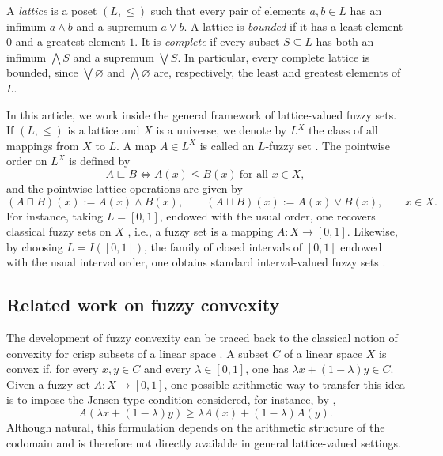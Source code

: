 \documentclass[11pt,a4paper]{article}
\begin{document}
\smallskip

A \emph{lattice} is a poset \((L,\leq)\) such that every pair of elements \(a,b\in L\) has an infimum \(a\wedge b\) and a supremum \(a\vee b\). A lattice is \emph{bounded} if it has a least element \(0\) and a greatest element \(1\). It is \emph{complete} if every subset \(S\subseteq L\) has both an infimum \(\bigwedge S\) and a supremum \(\bigvee S\). In particular, every complete lattice is bounded, since \(\bigvee\varnothing\) and \(\bigwedge\varnothing\) are, respectively, the least and greatest elements of \(L\).

\smallskip

In this article, we work inside the general framework of lattice-valued fuzzy sets. If \((L,\leq)\) is a lattice and \(X\) is a universe, we denote by \(L^X\) the class of all mappings from \(X\) to \(L\). A map \(A\in L^X\) is called an \(L\)-fuzzy set \citep{Goguen1967}. The pointwise order on \(L^X\) is defined by
\[
A\sqsubseteq B \iff A(x)\leq B(x)\ \text{for all }x\in X,
\]
and the pointwise lattice operations are given by
\[
(A\sqcap B)(x):=A(x)\wedge B(x),
\qquad
(A\sqcup B)(x):=A(x)\vee B(x),
\qquad x\in X.
\]
For instance, taking \(L=[0,1]\), endowed with the usual order, one recovers classical fuzzy sets on \(X\) \citep{Zadeh1965}, i.e., a fuzzy set is a mapping \(A:X\to[0,1]\). Likewise, by choosing \(L=I([0,1])\), the family of closed intervals of \([0,1]\) endowed with the usual interval order, one obtains standard interval-valued fuzzy sets \citep{Bustince2016,GrattanGuinness1976,Jahn1975,Sambuc75,Zadeh1971}.





\subsection{Related work on fuzzy convexity}

\smallskip

The development of fuzzy convexity can be traced back to the classical notion of convexity for crisp subsets of a linear space \citep{Klee1971}. A subset \(C\) of a linear space \(X\) is convex if, for every \(x,y\in C\) and every \(\lambda\in[0,1]\), one has \(\lambda x+(1-\lambda)y\in C\). Given a fuzzy set \(A:X\to[0,1]\), one possible arithmetic way to transfer this idea is to impose the Jensen-type condition considered, for instance, by \citet{AmmarMetz1992},
\begin{equation}\label{eq:jensen-fuzzy-convexity}
A(\lambda x+(1-\lambda)y)
\geq
\lambda A(x)+(1-\lambda)A(y).
\end{equation}
Although natural, this formulation depends on the arithmetic structure of the codomain and is therefore not directly available in general lattice-valued settings.
\end{document}
